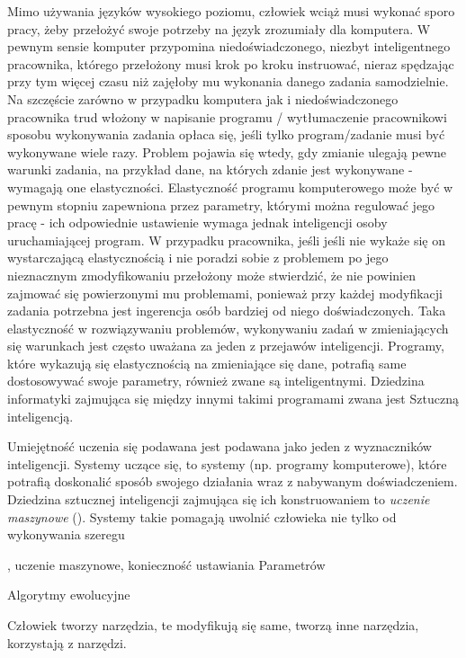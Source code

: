 Mimo używania języków wysokiego poziomu, człowiek wciąż musi wykonać sporo pracy, żeby przełożyć swoje potrzeby na język zrozumiały dla komputera. W pewnym sensie komputer przypomina niedoświadczonego, niezbyt inteligentnego pracownika, którego przełożony musi krok po kroku instruować, nieraz spędzając przy tym więcej czasu niż zajęłoby mu wykonania danego zadania samodzielnie. Na szczęście zarówno w przypadku komputera jak i niedoświadczonego pracownika trud włożony w napisanie programu / wytłumaczenie pracownikowi sposobu wykonywania zadania opłaca się, jeśli tylko program/zadanie musi być wykonywane wiele razy. Problem pojawia się wtedy, gdy zmianie ulegają pewne warunki zadania, na przykład dane, na których zdanie jest wykonywane - wymagają one elastyczności. Elastyczność programu komputerowego może być w pewnym stopniu zapewniona przez parametry, którymi można regulować jego pracę - ich odpowiednie ustawienie wymaga jednak inteligencji osoby uruchamiającej program. W przypadku pracownika, jeśli jeśli nie wykaże się on wystarczającą elastycznością i nie poradzi sobie z problemem po jego nieznacznym zmodyfikowaniu przełożony może stwierdzić, że nie powinien zajmować się powierzonymi mu problemami, ponieważ przy każdej modyfikacji zadania potrzebna jest ingerencja osób bardziej od niego doświadczonych. Taka elastyczność w rozwiązywaniu problemów, wykonywaniu zadań w zmieniających się warunkach jest często uważana za jeden z przejawów inteligencji. Programy, które wykazują się elastycznością na zmieniające się dane, potrafią same dostosowywać swoje parametry, również zwane są inteligentnymi. Dziedzina informatyki zajmująca się między innymi takimi programami zwana jest Sztuczną inteligencją.

Umiejętność uczenia się podawana jest podawana jako jeden z wyznaczników inteligencji. Systemy uczące się, to systemy (np. programy komputerowe), które potrafią doskonalić sposób swojego działania wraz z nabywanym doświadczeniem. Dziedzina sztucznej inteligencji zajmująca się ich konstruowaniem to \emph{uczenie maszynowe} (). Systemy takie pomagają uwolnić człowieka nie tylko od wykonywania szeregu 



, uczenie maszynowe, konieczność ustawiania Parametrów

Algorytmy ewolucyjne

Człowiek tworzy narzędzia, te modyfikują się same, tworzą inne narzędzia, korzystają z narzędzi.



